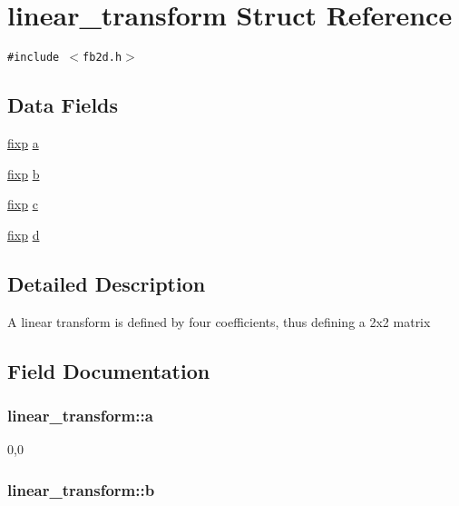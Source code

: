 \hypertarget{structlinear__transform}{
\section{linear\_\-transform Struct Reference}
\label{structlinear__transform}
}
{\tt \#include $<$fb2d.h$>$}

\subsection*{Data Fields}
\begin{CompactItemize}
\item 
\hyperlink{screen_8h_19d2c966acde4ded69e29a7c6e5ba523}{fixp} \hyperlink{structlinear__transform_85d4af4125aed8533ee71d9c99ed8f86}{a}
\item 
\hyperlink{screen_8h_19d2c966acde4ded69e29a7c6e5ba523}{fixp} \hyperlink{structlinear__transform_7a355147c9483ba5e1225376e99bda40}{b}
\item 
\hyperlink{screen_8h_19d2c966acde4ded69e29a7c6e5ba523}{fixp} \hyperlink{structlinear__transform_3aa106a626742aab0ff34ba42b2405f5}{c}
\item 
\hyperlink{screen_8h_19d2c966acde4ded69e29a7c6e5ba523}{fixp} \hyperlink{structlinear__transform_8dacf30dd4e0fe5f190e538393b22295}{d}
\end{CompactItemize}


\subsection{Detailed Description}
A linear transform is defined by four coefficients, thus defining a 2x2 matrix 

\subsection{Field Documentation}
\hypertarget{structlinear__transform_85d4af4125aed8533ee71d9c99ed8f86}{
\subsubsection{ {\bf linear\_\-transform::a}}}
\label{structlinear__transform_85d4af4125aed8533ee71d9c99ed8f86}


0,0 \hypertarget{structlinear__transform_7a355147c9483ba5e1225376e99bda40}{
\subsubsection{ {\bf linear\_\-transform::b}}}
\label{structlinear__transform_7a355147c9483ba5e1225376e99bda40}


